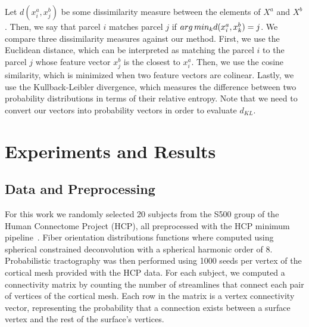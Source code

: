 Let $d(x^a_i,x^b_j)$ be some dissimilarity measure between the elements of $X^a$ and $X^b$. Then, we say that parcel $i$ matches parcel $j$ if $arg\,min_k d(x^a_i,x^b_k) = j$. We compare three dissimilarity measures against our method.
First, we use the Euclidean distance, which  can be interpreted as matching
the parcel $i$ to the parcel $j$ whose feature vector $x^b_j$ is the closest
to $x^a_i$. Then, we use the cosine similarity, which is minimized when two
feature vectors are colinear. Lastly, we use the Kullback-Leibler divergence,
which measures the difference between two probability distributions in terms
of their relative entropy. Note that we need to convert our vectors into
probability vectors in order to evaluate $d_{KL}$. 


\section{Experiments and Results}

\subsection{Data and Preprocessing}
\label{sec:fingerprint}
For this work we randomly selected 20 subjects from the S500 group of the Human
Connectome Project (HCP), all preprocessed with the HCP minimum
pipeline~\cite{Glasser2013}. Fiber orientation distributions functions where
computed using spherical constrained deconvolution with a spherical harmonic
order of 8. Probabilistic tractography was then performed using 1000 seeds per
vertex of the cortical mesh provided with the HCP data. For each subject, we
computed a connectivity matrix by counting the number of streamlines that
connect each pair of vertices of the cortical mesh. Each row in the matrix is
a vertex connectivity vector, representing the probability that a connection
exists between a surface vertex and the rest of the surface's vertices.

